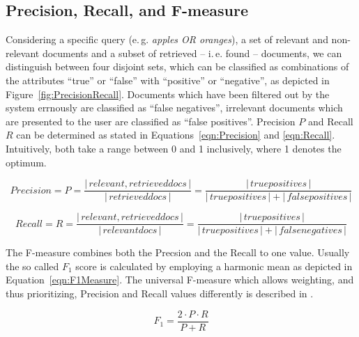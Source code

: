 
\subsection{Precision, Recall, and F-measure} \label{sec:Introduction:PrRcF1}

Considering a specific query (e.\,g. \textit{apples OR oranges}), a set of relevant and non-relevant documents and a subset of retrieved -- i.\,e. found -- documents, we can distinguish between four disjoint sets, which can be classified as combinations of the attributes ``true'' or ``false'' with ``positive'' or ``negative'', as depicted in Figure~\ref{fig:PrecisionRecall}. Documents which have been filtered out by the system errnously are classified as ``false negatives'', irrelevant documents which are presented to the user are classified as ``false positives''. Precision $P$ and Recall $R$ can be determined as stated in Equations~\ref{eqn:Precision} and \ref{eqn:Recall}. Intuitively, both take a range between 0 and 1 inclusively, where 1 denotes the optimum.

\begin{equation}
	\label{eqn:Precision}
	Precision = P = \frac{\left|\,\mathit{relevant, retrieved docs}\,\right|}{\left|\,\mathit{retrieved docs}\,\right|} = \frac{\left|\,\mathit{true positives}\,\right|}{\left|\,\mathit{true positives}\,\right| + \left|\,\mathit{false positives}\,\right|}
\end{equation}

\begin{equation}	
	\label{eqn:Recall}
	Recall = R = \frac{\left|\,\mathit{relevant, retrieved docs}\,\right|}{\left|\,\mathit{relevant docs}\,\right|} = \frac{\left|\,\mathit{true positives}\,\right|}{\left|\,\mathit{true positives}\,\right| + \left|\,\mathit{false negatives}\,\right|}
\end{equation}

The F-measure combines both the Precsion and the Recall to one value. Usually the so called $F_1$ score is calculated by employing a harmonic mean as depicted in Equation~\ref{eqn:F1Measure}. The universal F-measure which allows weighting, and thus prioritizing, Precision and Recall values differently is described in \cite[p.\,156]{Manning:2009}. 

\begin{equation}
	\label{eqn:F1Measure}
	F_1 = \frac{2 \cdot P \cdot R}{P + R}
\end{equation}



